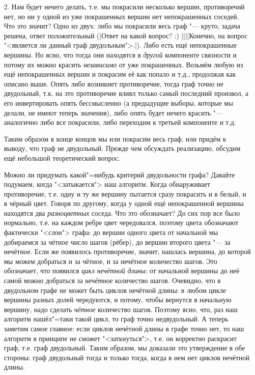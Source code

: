 2. Нам будет нечего делать, т.е. мы покрасили несколько вершин, противоречий нет, но ни у одной из 
уже покрашенных вершин нет непокрашенных соседей. Что это значит? Одно из двух: либо мы покрасили 
весь граф "--- круто, задача решена, ответ положительный (|Ответ на 
какой вопрос? :) ||||Конечно, на вопрос "<является ли данный граф двудольным">.|\label{whichtask}).  
Либо есть ещё непокрашенные вершины. Но ясно, что тогда они находятся в 
\textit{другой} компоненте связности и потому их можно красить \textit{независимо} от уже 
покрашенных. Возьмём любую из ещё непокрашенных вершин и покрасим её как попало и т.д., продолжая 
как описано выше. Опять либо возникнет противоречие, тогда граф точно не двудольный, т.к. на это 
противоречие влиял только самый последний произвол, а его инвертировать опять бессмысленно (а 
предыдущие выборы, которые мы делали, не имеют теперь значения), либо опять будет нечего красить 
"--- аналогично либо все покрасили, либо переходим к третьей компоненте и т.д.

Таким образом в конце концов мы или покрасим весь граф, или придём к выводу, что граф не 
двудольный. Прежде чем обсуждать реализацию, обсудим ещё небольшой теоретический вопрос.

Можно ли придумать какой"=нибудь критерий двудольности графа? Давайте подумаем, когда 
"<затыкается"> наш алгоритм. Когда обнаруживает противоречие, т.е. одну и ту же вершину пытается 
сразу покрасить и в белый, и в чёрный цвет. Говоря по другому, когда у одной ещё непокрашенной 
вершины находятся два \textit{разноцветных} соседа. Что это обозначает? До сих пор все было 
нормально, т.е. на каждом ребре цвет чередовался, поэтому цвета обозначают фактически "<слои"> 
графа: до вершин одного цвета от начальной мы добираемся за чётное число шагов (рёбер), до вершин второго 
цвета "--- за нечётное. Если же появилось противоречие, значит, нашлась вершина, до которой мы 
можем добраться и за чётное, и за нечётное количество шагов. Это обозначает, что появился 
\textit{цикл нечётной длины}: от начальной вершины до неё самой можно добраться за \textit{нечётное} 
количество шагов. Очевидно, что в двудольном графе не может быть циклов нечётной длины: в любом 
цикле вершины разных долей чередуются, и потому, чтобы вернутся в начальную вершину, надо сделать 
\textit{чётное} количество шагов. Поэтому ясно, что, раз наш алгоритм нашёл"=таки такой цикл, то 
граф точно недвудольный. А теперь заметим самое главное: если циклов нечётной длины в графе точно 
нет, то наш алгоритм в принципе не сможет "<заткнуться">, т.е. он корректно раскрасит граф, т.е. 
граф двудольный. Таким образом, мы доказали это утверждение в обе стороны: граф двудольный тогда и 
только тогда, когда в нем нет циклов нечётной длины.

